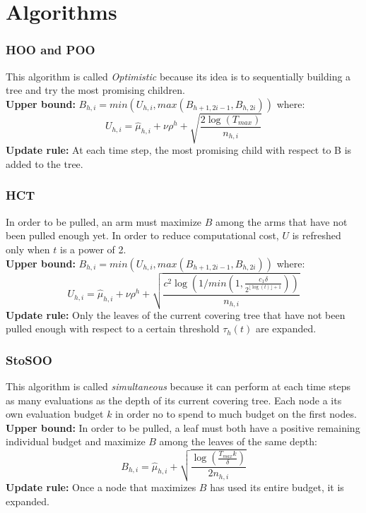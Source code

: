 \documentclass[xcolor={usenames,dvipsnames}]{beamer}
\begin{document}
\section{Algorithms}
\begin{frame}
\frametitle{HOO and POO}
This algorithm is called \textit{Optimistic} because its idea is to sequentially building a tree and try the most promising children.\\
\textbf{Upper bound:} $B_{h,i}=min(U_{h,i},max(B_{h+1,2i-1},B_{h,2i}))$ where:
\begin{equation}
\label{uhoo}
U_{h,i}=\widehat{\mu}_{h,i}+\nu \rho^h+\sqrt{\dfrac{2\log(T_{max})}{n_{h,i}}}
\end{equation}
\textbf{Update rule:} At each time step, the most promising child with respect to B is added to the tree.
\end{frame}

\begin{frame}
\frametitle{HCT}
In order to be pulled, an arm must maximize $B$ among the arms that have not been pulled enough yet. In order to reduce computational cost, $U$ is refreshed only when $t$ is a power of 2.\\
\textbf{Upper bound:} $B_{h,i}=min(U_{h,i},max(B_{h+1,2i-1},B_{h,2i}))$ where:
\begin{equation}
\label{uhct}
U_{h,i}=\widehat{\mu}_{h,i}+\nu \rho^h+\sqrt{\dfrac{c^2\log(1/min(1,\frac{c_1\delta}{2^{\lfloor \log(t) \rfloor + 1}}))}{n_{h,i}}}
\end{equation}
\textbf{Update rule:} Only the leaves of the current covering tree that have not been pulled enough with respect to a certain threshold $\tau_h(t)$ are expanded.
\end{frame}

\begin{frame}
\frametitle{StoSOO}
This algorithm is called \textit{simultaneous} because it can perform at each time steps as many evaluations as the depth of its current covering tree. Each node a its own evaluation budget $k$ in order no to spend to much budget on the first nodes.\\
\textbf{Upper bound:} In order to be pulled, a leaf must both have a positive remaining individual budget and maximize $B$ among the leaves of the same depth:
\begin{equation}
\label{bsoo}
B_{h,i}=\widehat{\mu}_{h,i}+\sqrt{\dfrac{\log(\frac{T_{max}k}{\delta})}{2n_{h,i}}}
\end{equation}
\textbf{Update rule:} Once a node that maximizes $B$ has used its entire budget, it is expanded.
\end{frame}
\end{document}
